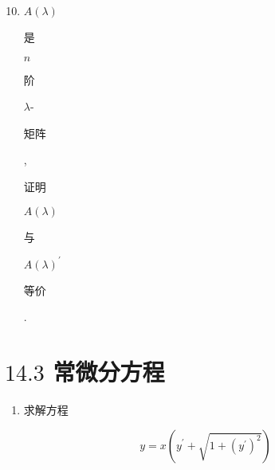 \documentclass[10pt]{article}
\begin{document}
\begin{enumerate}
  \setcounter{enumi}{9}
  \item $A(\lambda)$ \begin{CJK}{UTF8}{mj}是\end{CJK} $n$ \begin{CJK}{UTF8}{mj}阶\end{CJK} $\lambda$-\begin{CJK}{UTF8}{mj}矩阵\end{CJK}, \begin{CJK}{UTF8}{mj}证明\end{CJK} $A(\lambda)$ \begin{CJK}{UTF8}{mj}与\end{CJK} $A(\lambda)^{\prime}$ \begin{CJK}{UTF8}{mj}等价\end{CJK}.
\end{enumerate}
\section{$14.3$ 常微分方程}
\begin{enumerate}
  \item \begin{CJK}{UTF8}{mj}求解方程\end{CJK}
\end{enumerate}
$$
y=x\left(y^{\prime}+\sqrt{1+\left(y^{\prime}\right)^{2}}\right)
$$
\end{document}
